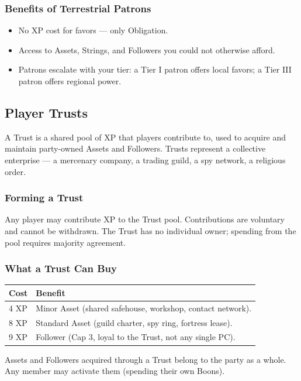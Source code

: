 \subsubsection{Benefits of Terrestrial Patrons}
\begin{itemize}
  \item No XP cost for favors --- only Obligation.
  \item Access to Assets, Strings, and Followers you could not otherwise afford.
  \item Patrons escalate with your tier: a Tier I patron offers local favors; a Tier III patron offers regional power.
\end{itemize}

\subsection{Player Trusts}

A Trust is a shared pool of XP that players contribute to, used to acquire and maintain party-owned Assets and Followers. Trusts represent a collective enterprise --- a mercenary company, a trading guild, a spy network, a religious order.

\subsubsection{Forming a Trust}
Any player may contribute XP to the Trust pool. Contributions are voluntary and cannot be withdrawn. The Trust has no individual owner; spending from the pool requires majority agreement.

\subsubsection{What a Trust Can Buy}
\begin{tabular}{@{}ll@{}}
\toprule
\textbf{Cost} & \textbf{Benefit} \\
\midrule
4 XP & Minor Asset (shared safehouse, workshop, contact network). \\
8 XP & Standard Asset (guild charter, spy ring, fortress lease). \\
9 XP & Follower (Cap 3, loyal to the Trust, not any single PC). \\
\bottomrule
\end{tabular}

Assets and Followers acquired through a Trust belong to the party as a whole. Any member may activate them (spending their own Boons).

